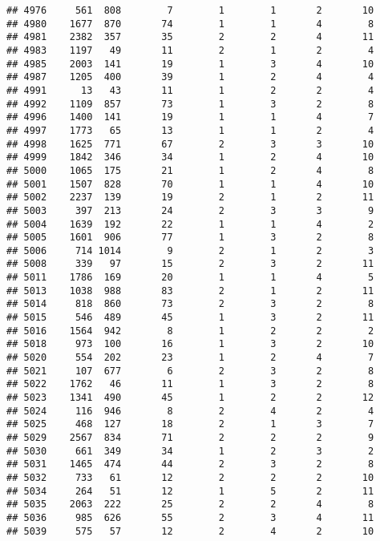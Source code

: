 \documentclass[]{article}
\begin{document}
\begin{verbatim}
## 4976     561  808        7        1        1       2       10
## 4980    1677  870       74        1        1       4        8
## 4981    2382  357       35        2        2       4       11
## 4983    1197   49       11        2        1       2        4
## 4985    2003  141       19        1        3       4       10
## 4987    1205  400       39        1        2       4        4
## 4991      13   43       11        1        2       2        4
## 4992    1109  857       73        1        3       2        8
## 4996    1400  141       19        1        1       4        7
## 4997    1773   65       13        1        1       2        4
## 4998    1625  771       67        2        3       3       10
## 4999    1842  346       34        1        2       4       10
## 5000    1065  175       21        1        2       4        8
## 5001    1507  828       70        1        1       4       10
## 5002    2237  139       19        2        1       2       11
## 5003     397  213       24        2        3       3        9
## 5004    1639  192       22        1        1       4        2
## 5005    1601  906       77        1        3       2        8
## 5006     714 1014        9        2        1       2        3
## 5008     339   97       15        2        3       2       11
## 5011    1786  169       20        1        1       4        5
## 5013    1038  988       83        2        1       2       11
## 5014     818  860       73        2        3       2        8
## 5015     546  489       45        1        3       2       11
## 5016    1564  942        8        1        2       2        2
## 5018     973  100       16        1        3       2       10
## 5020     554  202       23        1        2       4        7
## 5021     107  677        6        2        3       2        8
## 5022    1762   46       11        1        3       2        8
## 5023    1341  490       45        1        2       2       12
## 5024     116  946        8        2        4       2        4
## 5025     468  127       18        2        1       3        7
## 5029    2567  834       71        2        2       2        9
## 5030     661  349       34        1        2       3        2
## 5031    1465  474       44        2        3       2        8
## 5032     733   61       12        2        2       2       10
## 5034     264   51       12        1        5       2       11
## 5035    2063  222       25        2        2       4        8
## 5036     985  626       55        2        3       4       11
## 5039     575   57       12        2        4       2       10

\end{verbatim}
\end{document}
